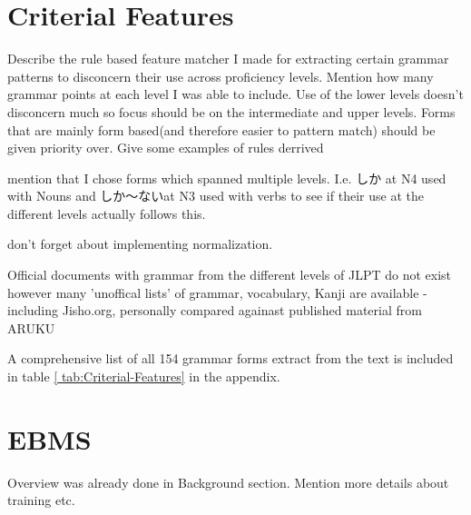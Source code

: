 \section{Criterial Features}

Describe the rule based feature matcher I made for extracting certain grammar patterns to disconcern their use
across proficiency levels. Mention how many grammar points at each level I was able to include. Use of the lower
levels doesn't disconcern much so focus should be on the intermediate and upper levels.  Forms that are mainly form
based(and therefore easier to pattern match) should be given priority over. Give some examples of rules derrived

mention that I chose forms which spanned multiple levels. I.e. しか at N4 used with Nouns and しか〜ないat N3 used
with verbs to see if their use at the different levels actually follows this.

don't forget about implementing normalization.

Official documents with grammar from the different levels of JLPT do not exist however many 'unoffical lists' of
grammar, vocabulary, Kanji are available - including Jisho.org, personally compared againast published material from
ARUKU

A comprehensive list of all 154 grammar forms extract from the text is included in table \ref{
tab:Criterial-Features} in the appendix.


\section{EBMS}

 Overview was already done in Background section. Mention more details about training etc.


